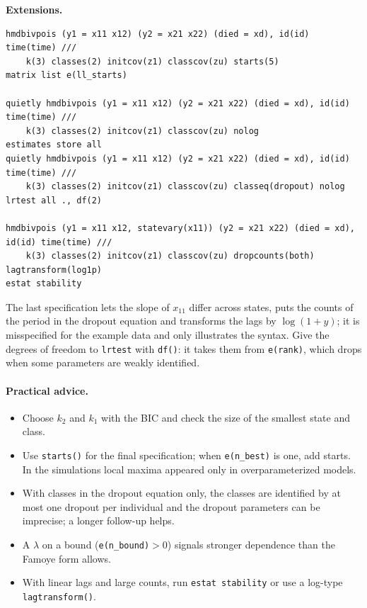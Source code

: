 \documentclass[11pt,a4paper]{article}
\newcommand{\cmd}[1]{\texttt{#1}}
\begin{document}
\medskip\noindent\textbf{Extensions.}\par\nopagebreak
\begin{lstlisting}
hmdbivpois (y1 = x11 x12) (y2 = x21 x22) (died = xd), id(id) time(time) ///
    k(3) classes(2) initcov(z1) classcov(zu) starts(5)
matrix list e(ll_starts)

quietly hmdbivpois (y1 = x11 x12) (y2 = x21 x22) (died = xd), id(id) time(time) ///
    k(3) classes(2) initcov(z1) classcov(zu) nolog
estimates store all
quietly hmdbivpois (y1 = x11 x12) (y2 = x21 x22) (died = xd), id(id) time(time) ///
    k(3) classes(2) initcov(z1) classcov(zu) classeq(dropout) nolog
lrtest all ., df(2)

hmdbivpois (y1 = x11 x12, statevary(x11)) (y2 = x21 x22) (died = xd), id(id) time(time) ///
    k(3) classes(2) initcov(z1) classcov(zu) dropcounts(both) lagtransform(log1p)
estat stability
\end{lstlisting}
The last specification lets the slope of $x_{11}$ differ across states, puts the counts of the period in
the dropout equation and transforms the lags by $\log(1+y)$; it is misspecified for the example data and
only illustrates the syntax. Give the degrees of freedom to \cmd{lrtest} with \cmd{df()}: it takes them
from \cmd{e(rank)}, which drops when some parameters are weakly identified.

\paragraph{Practical advice.}
\begin{itemize}
\item Choose $k_2$ and $k_1$ with the BIC and check the size of the smallest state and class.
\item Use \cmd{starts()} for the final specification; when \cmd{e(n\_best)} is one, add starts. In the
simulations local maxima appeared only in overparameterized models.
\item With classes in the dropout equation only, the classes are identified by at most one dropout per
individual and the dropout parameters can be imprecise; a longer follow-up helps.
\item A $\lambda$ on a bound (\cmd{e(n\_bound)}$>0$) signals stronger dependence than the Famoye form
allows.
\item With linear lags and large counts, run \cmd{estat stability} or use a log-type
\cmd{lagtransform()}.
\end{itemize}
\end{document}
